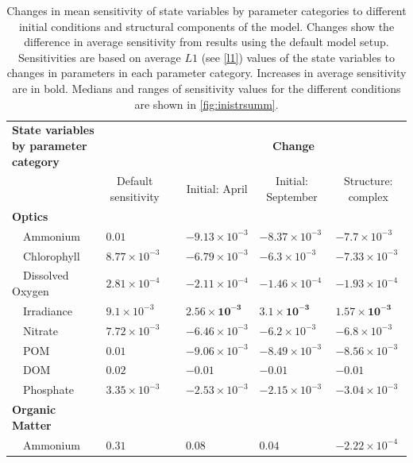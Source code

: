 \documentclass[letterpaper,12pt,oneside]{article}\usepackage[]{graphicx}\usepackage[]{color}
\begin{document}
\begin{table}[!tbp]
{\scriptsize
\caption{Changes in mean sensitivity of state variables by parameter categories to different initial conditions and structural components of the model.  Changes show the difference in average sensitivity from results using the default model setup. Sensitivities are based on average $L1$ (see \cref{l1}) values of the state variables to changes in parameters in each parameter category. Increases in average sensitivity are in bold. Medians and ranges of sensitivity values for the different conditions are shown in \cref{fig:inistrsumm}.\label{tab:inistrchg}} 
\begin{center}
\begin{tabular}{llclll}
\hline\hline
\multicolumn{1}{l}{\bfseries State variables by parameter category}&\multicolumn{1}{c}{\bfseries }&\multicolumn{1}{c}{\bfseries }&\multicolumn{3}{c}{\bfseries Change}\tabularnewline
\cline{4-6}
\multicolumn{1}{l}{}&\multicolumn{1}{c}{Default sensitivity}&\multicolumn{1}{c}{}&\multicolumn{1}{c}{Initial: April}&\multicolumn{1}{c}{Initial: September}&\multicolumn{1}{c}{Structure: complex}\tabularnewline
\hline
{\bfseries Optics}&&&&&\tabularnewline
~~Ammonium&$0.01$&&$-9.13\times 10^{-3}$&$-8.37\times 10^{-3}$&$-7.7\times 10^{-3}$\tabularnewline
~~Chlorophyll&$8.77\times 10^{-3}$&&$-6.79\times 10^{-3}$&$-6.3\times 10^{-3}$&$-7.33\times 10^{-3}$\tabularnewline
~~Dissolved Oxygen&$2.81\times 10^{-4}$&&$-2.11\times 10^{-4}$&$-1.46\times 10^{-4}$&$-1.93\times 10^{-4}$\tabularnewline
~~Irradiance&$9.1\times 10^{-3}$&&$\bm{2.56\times 10^{-3}}$&$\bm{3.1\times 10^{-3}}$&$\bm{1.57\times 10^{-3}}$\tabularnewline
~~Nitrate&$7.72\times 10^{-3}$&&$-6.46\times 10^{-3}$&$-6.2\times 10^{-3}$&$-6.8\times 10^{-3}$\tabularnewline
~~POM&$0.01$&&$-9.06\times 10^{-3}$&$-8.49\times 10^{-3}$&$-8.56\times 10^{-3}$\tabularnewline
~~DOM&$0.02$&&$-0.01$&$-0.01$&$-0.01$\tabularnewline
~~Phosphate&$3.35\times 10^{-3}$&&$-2.53\times 10^{-3}$&$-2.15\times 10^{-3}$&$-3.04\times 10^{-3}$\tabularnewline
\hline
{\bfseries Organic Matter}&&&&&\tabularnewline
~~Ammonium&$0.31$&&$\bm{0.08}$&$\bm{0.04}$&$-2.22\times 10^{-4}$\tabularnewline

\end{tabular}
\end{center}}
\end{table}
\end{document}
